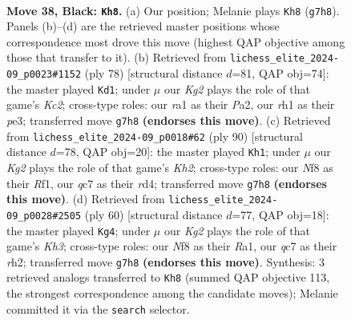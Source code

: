 \documentclass[11pt]{article}
\begin{document}
\clearpage

\begin{figure}[p]\centering
\begin{subfigure}{0.46\textwidth}\centering
\resizebox{\linewidth}{!}{%
\newchessgame
\chessboard[
  setfen={5n2/ppQ3kp/7p/1r6/3P4/5q2/4N3/R5KR b - - 1 38},
  showmover=false,
  pgfstyle=straightmove, color=movearrow, markmove={g7-h8}
]}
\caption{}
\end{subfigure}\hfill
\begin{subfigure}{0.46\textwidth}\centering
\resizebox{\linewidth}{!}{%
\newchessgame
\chessboard[
  setfen={1r4k1/p7/6q1/6N1/2pP1Q2/2P1p3/P1K2PP1/8 w - - 0 40},
  showmover=false,
  pgfstyle=straightmove, color=movearrow, markmove={c2-d1}
]}
\caption{}
\end{subfigure}
\\[4pt]
\begin{subfigure}{0.46\textwidth}\centering
\resizebox{\linewidth}{!}{%
\newchessgame
\chessboard[
  setfen={k1r5/p7/4p3/4N3/2PrqP1p/7P/5QPK/5R2 w - - 7 46},
  showmover=false,
  pgfstyle=straightmove, color=movearrow, markmove={h2-h1}
]}
\caption{}
\end{subfigure}\hfill
\begin{subfigure}{0.46\textwidth}\centering
\resizebox{\linewidth}{!}{%
\newchessgame
\chessboard[
  setfen={7k/pp6/2n5/2Q3P1/2P5/1P4PK/Pr5r/R7 w - - 0 31},
  showmover=false,
  pgfstyle=straightmove, color=movearrow, markmove={h3-g4}
]}
\caption{}
\end{subfigure}
\caption{\textbf{Move 38, Black: \texttt{Kh8}.} (a) Our position; Melanie plays \texttt{Kh8} (\texttt{g7h8}). Panels (b)--(d) are the retrieved master positions whose correspondence most drove this move (highest QAP objective among those that transfer to it). (b) Retrieved from \texttt{lichess\_elite\_2024-09\_p0023\#1152} (ply 78) [structural distance $d$=81, QAP obj=74]: the master played \texttt{Kd1}; under $\mu$ our \emph{Kg2} plays the role of that game's \emph{Kc2}; cross-type roles: our \emph{r}a1 as their \emph{P}a2, our \emph{r}h1 as their \emph{p}e3; transferred move \texttt{g7h8} \textbf{(endorses this move)}. (c) Retrieved from \texttt{lichess\_elite\_2024-09\_p0018\#62} (ply 90) [structural distance $d$=78, QAP obj=20]: the master played \texttt{Kh1}; under $\mu$ our \emph{Kg2} plays the role of that game's \emph{Kh2}; cross-type roles: our \emph{N}f8 as their \emph{R}f1, our \emph{q}c7 as their \emph{r}d4; transferred move \texttt{g7h8} \textbf{(endorses this move)}. (d) Retrieved from \texttt{lichess\_elite\_2024-09\_p0028\#2505} (ply 60) [structural distance $d$=77, QAP obj=18]: the master played \texttt{Kg4}; under $\mu$ our \emph{Kg2} plays the role of that game's \emph{Kh3}; cross-type roles: our \emph{N}f8 as their \emph{R}a1, our \emph{q}c7 as their \emph{r}h2; transferred move \texttt{g7h8} \textbf{(endorses this move)}. Synthesis: 3 retrieved analogs transferred to \texttt{Kh8} (summed QAP objective 113, the strongest correspondence among the candidate moves); Melanie committed it via the \texttt{search} selector.}
\label{fig:thought-m75}
\end{figure}
\end{document}

